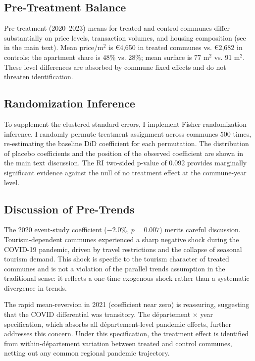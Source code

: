 \documentclass[12pt]{article}
\begin{document}
{\subsection{Pre-Treatment Balance}

Pre-treatment (2020--2023) means for treated and control communes differ substantially on price levels, transaction volumes, and housing composition (see  in the main text). Mean price/m$^2$ is \euro{4,650} in treated communes vs. \euro{2,682} in controls; the apartment share is 48\% vs. 28\%; mean surface is 77 m$^2$ vs. 91 m$^2$. These level differences are absorbed by commune fixed effects and do not threaten identification.

\subsection{Randomization Inference}

To supplement the clustered standard errors, I implement Fisher randomization inference. I randomly permute treatment assignment across communes 500 times, re-estimating the baseline DiD coefficient for each permutation. The distribution of placebo coefficients and the position of the observed coefficient are shown in the main text discussion. The RI two-sided p-value of 0.092 provides marginally significant evidence against the null of no treatment effect at the commune-year level.

\subsection{Discussion of Pre-Trends}

The 2020 event-study coefficient ($-$2.0\%, $p = 0.007$) merits careful discussion. Tourism-dependent communes experienced a sharp negative shock during the COVID-19 pandemic, driven by travel restrictions and the collapse of seasonal tourism demand. This shock is specific to the tourism character of treated communes and is not a violation of the parallel trends assumption in the traditional sense: it reflects a one-time exogenous shock rather than a systematic divergence in trends.

The rapid mean-reversion in 2021 (coefficient near zero) is reassuring, suggesting that the COVID differential was transitory. The d\'epartement $\times$ year specification, which absorbs all d\'epartement-level pandemic effects, further addresses this concern. Under this specification, the treatment effect is identified from within-d\'epartement variation between treated and control communes, netting out any common regional pandemic trajectory.

}
\end{document}
